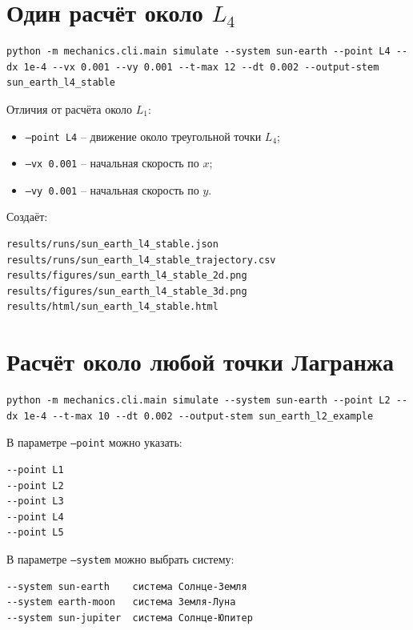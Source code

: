 \documentclass[a4paper,12pt]{article}
\begin{document}
\section{Один расчёт около $L_4$}

\begin{lstlisting}
python -m mechanics.cli.main simulate --system sun-earth --point L4 --dx 1e-4 --vx 0.001 --vy 0.001 --t-max 12 --dt 0.002 --output-stem sun_earth_l4_stable
\end{lstlisting}

Отличия от расчёта около $L_1$:

\begin{itemize}[leftmargin=1.2cm]
  \item \texttt{--point L4} -- движение около треугольной точки $L_4$;
  \item \texttt{--vx 0.001} -- начальная скорость по $x$;
  \item \texttt{--vy 0.001} -- начальная скорость по $y$.
\end{itemize}

Создаёт:

\begin{lstlisting}
results/runs/sun_earth_l4_stable.json
results/runs/sun_earth_l4_stable_trajectory.csv
results/figures/sun_earth_l4_stable_2d.png
results/figures/sun_earth_l4_stable_3d.png
results/html/sun_earth_l4_stable.html
\end{lstlisting}

\section{Расчёт около любой точки Лагранжа}

\begin{lstlisting}
python -m mechanics.cli.main simulate --system sun-earth --point L2 --dx 1e-4 --t-max 10 --dt 0.002 --output-stem sun_earth_l2_example
\end{lstlisting}

В параметре \texttt{--point} можно указать:

\begin{lstlisting}
--point L1
--point L2
--point L3
--point L4
--point L5
\end{lstlisting}

В параметре \texttt{--system} можно выбрать систему:

\begin{lstlisting}
--system sun-earth    система Солнце-Земля
--system earth-moon   система Земля-Луна
--system sun-jupiter  система Солнце-Юпитер
\end{lstlisting}
\end{document}
